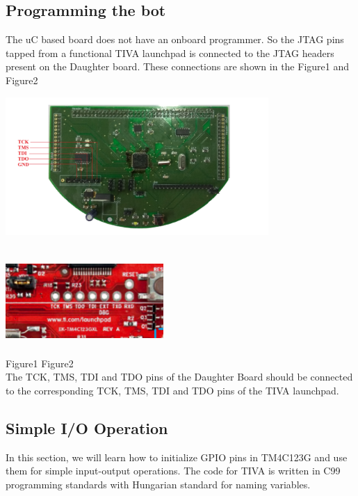 \documentclass[a4paper,10pt,oneside]{article}
\begin{document}
{		\subsection{Programming the bot}
		The uC based board does not have an onboard programmer. So the JTAG pins tapped from a functional TIVA launchpad is connected to the JTAG headers present on the Daughter board. These connections are shown in the Figure1 and Figure2\\
		\includegraphics[width=10cm, height=6cm]{Pro}
		\includegraphics[width=6cm, height=4cm]{TI}\\
		
		\hspace{4cm}
		Figure1
		\hspace{6cm}
		Figure2\\
		{The TCK, TMS, TDI and TDO pins of the Daughter Board should be connected to the corresponding TCK, TMS, TDI and TDO pins of the TIVA launchpad.}			
			
			
		\subsection{\textbf{Simple I/O Operation}}
			{In this section, we will learn how to initialize GPIO pins in TM4C123G and use them for simple input-output operations. The code for TIVA is written in C99 programming standards with Hungarian standard for naming variables. }
}
\end{document}
